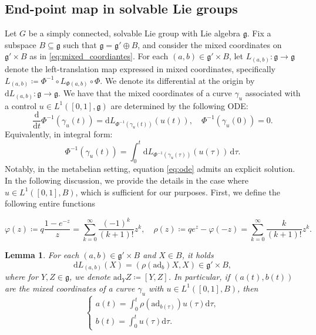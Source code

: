 \documentclass[a4paper,11pt,reqno]{amsart}
\theoremstyle{plain}
\newtheorem{lemma}[theorem]{Lemma}
\theoremstyle{definition}
\newcommand{\g}{\mathfrak{g}}
\newcommand{\de}{\mathrm{d}}
\newcommand{\ad}{\mathrm{ad}}
\begin{document}
\subsection{End-point map in solvable Lie groups} 
Let $G$ be a simply connected, solvable Lie group with Lie algebra $\mathfrak{g}$. Fix a subspace $B \subseteq \mathfrak{g}$ such that $\mathfrak{g} = \mathfrak{g}' \oplus B$, and consider the mixed coordinates on $\mathfrak{g}' \times B$ as in \eqref{eq:mixed_coordiantes}. For each $(a,b) \in \mathfrak{g}' \times B$, let $L_{(a,b)} \colon \mathfrak{g} \to \mathfrak{g}$ denote the left-translation map expressed in mixed coordinates, specifically $L_{(a,b)} \coloneq  \Phi^{-1} \circ L_{\Phi(a,b)} \circ \Phi$. 
We denote its differential at the origin by $\de L_{(a,b)} \colon \mathfrak{g} \to \mathfrak{g}$.
We have that the mixed coordinates of a curve $\gamma_u$ associated with a control $u \in L^1([0,1], \mathfrak{g})$ are determined by the following ODE:
\begin{equation} \label{eq:ode}
\frac{\de}{\de t} \Phi^{-1}(\gamma_u(t)) = \de L_{\Phi^{-1}(\gamma_u(t))}(u(t)), \quad \Phi^{-1}(\gamma_u(0)) = 0.
\end{equation}
Equivalently, in integral form:
\begin{equation} 
\label{eq:integral_ode}\Phi^{-1}(\gamma_u(t)) = \int^t_0 \de L_{\Phi^{-1}(\gamma_u(\tau))}(u(\tau)) \, \de \tau.
\end{equation}
Notably, in the metabelian setting, equation \eqref{eq:ode} admits an explicit solution. In the following discussion, we provide the details in the case where $u \in L^1([0,1], B)$, which is sufficient for our purposes. First, we define the following entire functions

\begin{equation} \label{eq:power_series}
    \varphi(z) \coloneq q \frac{1 - e^{-z}}{z} = \sum_{k=0}^\infty \frac{(-1)^k}{(k+1)!}z^k,  \quad \rho(z) \coloneq q e^z - \varphi(-z) = \sum_{k=0}^\infty \frac{k}{(k+1)!}z^k.
\end{equation}

\begin{lemma}
    For each $(a,b) \in \mathfrak{g}' \times B$ and $X \in B$, it holds
    \begin{equation} \label{eq:differential}
        \de L_{(a,b)}(X)= ( \rho(\ad_b)X,X) \in \g' \times B,
    \end{equation}
    where for $Y,Z\in \g$, we denote $\ad_YZ\coloneq [Y,Z]$.
    In particular, if $(a(t),b(t))$ are the mixed coordinates of a curve $\gamma_u$ with $u \in L^1([0,1], B)$, then
    \begin{equation} \label{eq:curve_coordinates}
\begin{cases}
a(t) = \int^t_0 \rho(\ad_{b(\tau)}) u(\tau) \de \tau, \\
b(t) = \int_0^t u(\tau) \de \tau.
\end{cases}
\end{equation}
\end{lemma}
\end{document}
